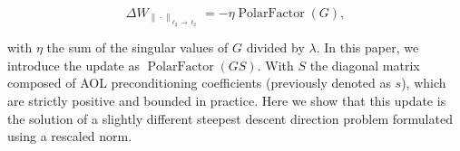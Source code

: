     
    \begin{equation*}
        \Delta W_{\| \cdot \|_{\ell_2 \rightarrow \ell_2}} = -\eta \operatorname{PolarFactor}(G),
    \end{equation*}
    
    \noindent with $\eta$ the sum of the singular values of $G$ divided by $\lambda$. In this paper, we introduce the \turbomuon update as $\operatorname{PolarFactor}(G S)$. With $S$ the diagonal matrix composed of AOL preconditioning coefficients (previously denoted as $s$), which are strictly positive and bounded in practice. Here we show that this update is the solution of a slightly different steepest descent direction problem formulated using a rescaled norm.
    
        
    
    

